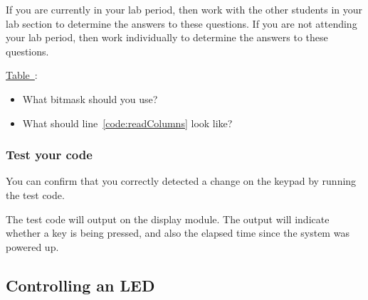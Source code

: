If you are currently in your lab period, then work with the other students in your lab section to determine the answers to these questions.
If you are not attending your lab period, then work individually to determine the answers to these questions.
\begin{description}
     \href{https://cow-pi.readthedocs.io/en/latest/CowPi_\lowercaseprocessor/io_registers.html#\mappingtablelink}{Table~\mappingtablenumber}:
        \begin{itemize}
            \item What bitmask should you use?
            \item What should line~\ref{code:readColumns} look like?
        \end{itemize}
\end{description}



\subsubsection*{Test your code}

You can confirm that you correctly detected a change on the keypad by running the test code.
\begin{description}
\end{description}
The test code will output on the display module.
The output will indicate whether a key is being pressed, and also the elapsed time since the system was powered up.


\subsection{Controlling an LED} \label{subsec:controlLED}

